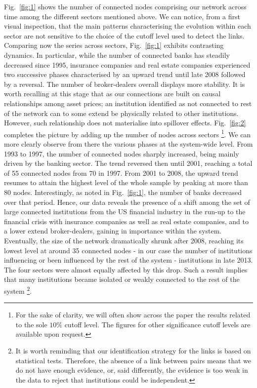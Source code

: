 \documentclass[a4paper,10pt]{article}
\begin{document}
Fig.~\ref{fig:1} shows the number of connected nodes comprising our network across time among the different sectors mentioned 
above. We can notice, from a first visual inspection, that the main patterns characterising the evolution within each sector 
are not sensitive to the choice of the cutoff level used to detect the links. Comparing now the series across sectors,
Fig.~\ref{fig:1} exhibits contrasting dynamics. In particular, while the number of connected banks has steadily decreased since 1995, insurance companies and real estate companies experienced two successive phases characterised by an upward trend until late 2008 followed 
by a reversal. The number of broker-dealers overall displays more stability. It is worth recalling at this stage that as our 
connections are built on causal relationships among asset prices; an institution identified as not connected to rest of the 
network can to some extend be physically related to other institutions. However, such relationship does not materialise into 
spillover effects. Fig.~\ref{fig:2} completes the picture by adding up the number of nodes across sectors \footnote{For the sake of clarity, we will often show across the paper the results related to the sole $10 \% $ cutoff level. 
The figures for other significance cutoff levels are available upon request.}. We can more clearly observe from there the various phases at the system-wide level. 
From 1993 to 1997, the number of connected nodes sharply increased, being mainly driven by the banking sector. The trend reversed then until 2001, reaching 
a total of 55 connected nodes from 70 in 1997.  From 2001 to 2008, the upward trend resumes to attain the highest level of the
whole sample by peaking at more than 80 nodes. Interestingly, as noted in Fig.~\ref{fig:1}, the number of banks decreased over
that period. Hence, our data reveals the presence of a shift among the set of large connected institutions from the US 
financial industry in the run-up to the financial crisis with insurance companies as well as real estate companies, and to a
lower extend broker-dealers, gaining in importance within the system. Eventually, the size of the network dramatically shrunk 
after 2008, reaching its lowest level at around 35 connected nodes - in our case the number of institutions influencing or been influenced 
by the rest of the system - institutions in late 2013. The four sectors were almost equally affected by this drop. Such a result implies that many institutions became isolated or weakly connected to the rest of the system
\footnote{It is worth reminding that our identification strategy for the links is based on 
 statistical tests. Therefore, the absence of a link between pairs means that we do not have enough evidence, or, said 
 differently, the evidence is too weak
 in the data to reject that institutions could be independent.}. 
\end{document}
